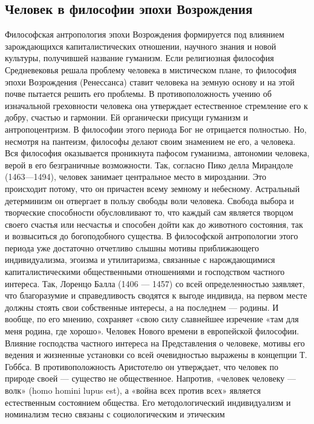 \documentclass[12pt]{article}
\begin{document}
\subsection{Человек в философии эпохи Возрождения}

Философская антропология эпохи Возрождения формируется под влиянием зарождающихся капиталистических
отношении, научного знания и новой культуры, получившей название гуманизм.
Если религиозная философия Средневековья решала проблему человека в мистическом плане, то философия
эпохи Возрождения (Ренессанса) ставит человека на земную основу и на этой почве пытается решить его
проблемы. В противоположность учению об изначальной греховности человека она утверждает естественное
стремление  его  к  добру,  счастью  и  гармонии.  Ей  органически  присущи  гуманизм  и  антропоцентризм.  В
философии этого периода Бог не отрицается полностью. Но, несмотря на пантеизм, философы делают своим
знамением  не  его,  а  человека.  Вся  философия  оказывается  проникнута  пафосом  гуманизма,  автономии
человека, верой в его безграничные возможности.
Так, согласно Пико делла Мирандоле (1463—1494), человек занимает центральное место в мироздании. Это
происходит потому, что он причастен всему земному и небесному. Астральный детерминизм он отвергает в
пользу свободы воли человека. Свобода выбора и творческие способности обусловливают то, что каждый сам
является  творцом  своего  счастья  или  несчастья  и  способен  дойти  как  до  животного  состояния,  так  и
возвыситься до богоподобного существа.
В  философской  антропологии  этого  периода  уже  достаточно  отчетливо  слышны  мотивы  приближающего
индивидуализма, эгоизма и утилитаризма, связанные с нарождающимися капиталистическими общественными
отношениями и господством частного интереса. Так, Лоренцо Балла (1406 — 1457) со всей определенностью
заявляет, что благоразумие и справедливость сводятся к выгоде индивида, на первом месте должны стоять свои
собственные интересы, а на последнем — родины. И вообще, по его мнению, сохраняет «свою силу славнейшее
изречение «там для меня родина, где хорошо».
Человек Нового времени в европейской философии.
Влияние  господства  частного  интереса  на  Представления  о  человеке,  мотивы  его  ведения  и  жизненные
установки  со всей  очевидностью  выражены в  концепции  Т.  Гоббса.  В противоположность  Аристотелю он
утверждает, что человек по природе своей — существо не общественное. Напротив, «человек человеку — волк»
(homo  homini  lupus  est),  а  «война  всех  против  всех»  является  естественным  состоянием  общества.  Его
методологический  индивидуализм  и  номинализм  тесно  связаны  с  социологическим  и  этическим
\end{document}
